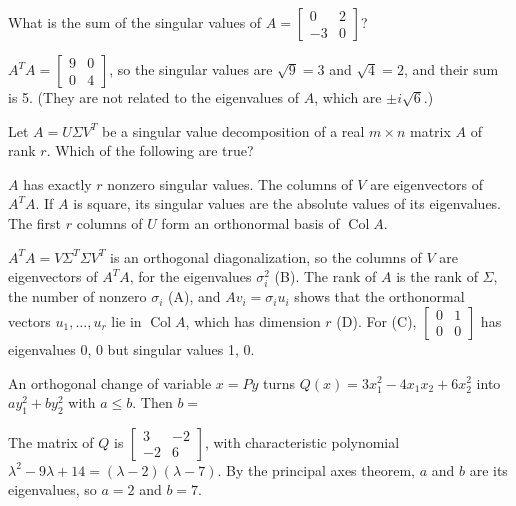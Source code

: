 \begin{question}[id=sym-15]
What is the sum of the singular values of $A = \begin{bmatrix} 0 & 2 \\ -3 & 0 \end{bmatrix}$?
\begin{solution}
$A^TA = \begin{bmatrix} 9 & 0 \\ 0 & 4 \end{bmatrix}$, so the singular values are $\sqrt{9} = 3$ and $\sqrt{4} = 2$, and their sum is 5. (They are not related to the eigenvalues of $A$, which are $\pm i\sqrt{6}$.)
\end{solution}
\end{question}

\begin{question}[id=sym-16, type=msq, marks=2]
Let $A = U\Sigma V^T$ be a singular value decomposition of a real $m \times n$ matrix $A$ of rank $r$. Which of the following are true?
\begin{options}
  \correct $A$ has exactly $r$ nonzero singular values.
  \correct The columns of $V$ are eigenvectors of $A^TA$.
  \option If $A$ is square, its singular values are the absolute values of its eigenvalues.
  \correct The first $r$ columns of $U$ form an orthonormal basis of $\operatorname{Col} A$.
\end{options}
\begin{solution}
$A^TA = V\Sigma^T\Sigma V^T$ is an orthogonal diagonalization, so the columns of $V$ are eigenvectors of $A^TA$, for the eigenvalues $\sigma_i^2$ (B). The rank of $A$ is the rank of $\Sigma$, the number of nonzero $\sigma_i$ (A), and $Av_i = \sigma_i u_i$ shows that the orthonormal vectors $u_1, \dots, u_r$ lie in $\operatorname{Col} A$, which has dimension $r$ (D). For (C), $\begin{bmatrix} 0 & 1 \\ 0 & 0 \end{bmatrix}$ has eigenvalues 0, 0 but singular values 1, 0.
\end{solution}
\end{question}

\begin{question}[id=sym-17, marks=2]
An orthogonal change of variable $x = Py$ turns $Q(x) = 3x_1^2 - 4x_1x_2 + 6x_2^2$ into $ay_1^2 + by_2^2$ with $a \le b$. Then $b =$
\begin{solution}
The matrix of $Q$ is $\begin{bmatrix} 3 & -2 \\ -2 & 6 \end{bmatrix}$, with characteristic polynomial $\lambda^2 - 9\lambda + 14 = (\lambda - 2)(\lambda - 7)$. By the principal axes theorem, $a$ and $b$ are its eigenvalues, so $a = 2$ and $b = 7$.
\end{solution}
\end{question}

